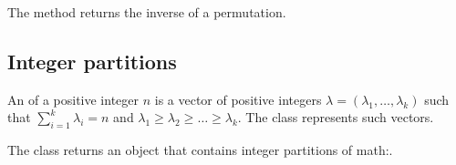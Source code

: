 \documentclass[letterpaper,10pt,english]{sphinxmanual}
\begin{document}
\sphinxAtStartPar
The  method returns the inverse of a permutation.

\begin{sphinxVerbatim}[commandchars=\\\{\}]
\end{sphinxVerbatim}


\subsection{Integer partitions}
\label{\detokenize{index:integer-partitions}}
\sphinxAtStartPar
An  of a positive integer \(n\) is a vector of positive integers
\(\lambda=(\lambda_1,\ldots,\lambda_k)\) such that \(\sum_{i=1}^k \lambda_i=n\) and
\(\lambda_1\geq \lambda_2\geq \ldots\geq\lambda_k\).
The  class represents such vectors.

\begin{sphinxVerbatim}[commandchars=\\\{\}]
\PYG{p}{[}\PYG{p}{]}
\PYG{p}{[}\PYG{p}{]}
\end{sphinxVerbatim}

\sphinxAtStartPar
The  class returns an object that contains  integer partitions of math:.

\begin{sphinxVerbatim}[commandchars=\\\{\}]
   
     \PYG{p}{[}\PYG{p}{]}
\end{sphinxVerbatim}
\end{document}
